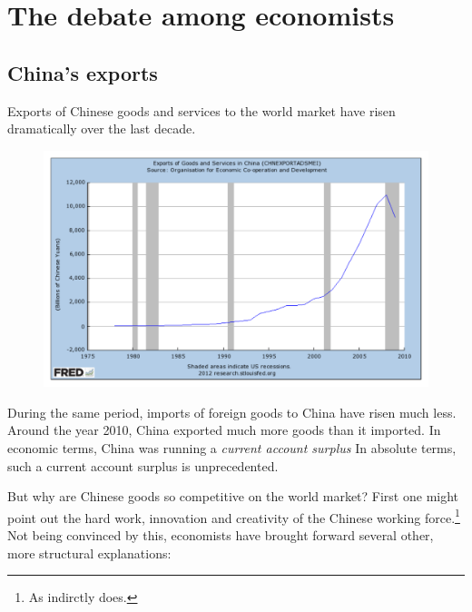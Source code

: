 \documentclass[11pt]{article}
\begin{document}
\setlength{\parindent}{0pt}

\tableofcontents
\section{The debate among economists}

\subsection{China's exports}

Exports of Chinese goods and services to the world market have risen dramatically over the last decade. %
   
     \begin{figure}[h]
     \begin{center}
     \includegraphics[width=1\textwidth]{ExportsChinaFRED.pdf}
     \end{center}
     \end{figure}

During the same period, imports of foreign goods to China have risen much less. Around the year 2010, China exported much more goods than it imported. In economic terms, China was running a \emph{current account surplus} In absolute terms, such a current account surplus  is unprecedented. %

But why are Chinese goods so competitive on the world market? First one might point out the hard work, innovation and creativity of the Chinese working force.\footnote{As \cite[p. 18]{Yu2010} indirctly does.} Not being convinced by this, economists have brought forward several other, more structural explanations:
\end{document}
